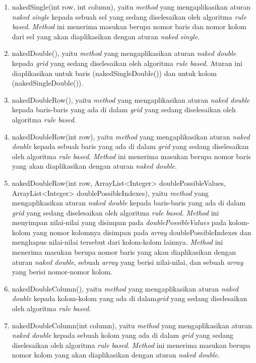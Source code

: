 \begin{enumerate}
\item nakedSingle(int row, int column), yaitu \textit{method} yang mengaplikasikan aturan \textit{naked single} kepada sebuah sel yang sedang diselesaikan oleh algoritma \textit{rule based}. \textit{Method} ini menerima masukan berupa nomor baris dan nomor kolom dari sel yang akan diaplikasikan dengan aturan \textit{naked single}.
\item nakedDouble(), yaitu \textit{method} yang mengaplikasikan aturan \textit{naked double} kepada \textit{grid} yang sedang diselesaikan oleh algoritma \textit{rule based}. Aturan ini diaplikasikan untuk baris (nakedSingleDouble()) dan untuk kolom (nakedSingleDouble()).
\item nakedDoubleRow(), yaitu \textit{method} yang mengaplikasikan aturan \textit{naked double} kepada baris-baris yang ada di dalam \textit{grid} yang sedang diselesaikan oleh algoritma \textit{rule based}.
\item nakedDoubleRow(int row), yaitu \textit{method} yang mengaplikasikan aturan \textit{naked double} kepada sebuah baris yang ada di dalam \textit{grid} yang sedang diselesaikan oleh algoritma \textit{rule based}. \textit{Method} ini menerima masukan berupa nomor baris yang akan diaplikasikan dengan aturan \textit{naked double}.
\item nakedDoubleRow(int row, ArrayList<Integer> doublePossibleValues, ArrayList<Integer> doublePossibleIndexes), yaitu \textit{method} yang mengaplikasikan aturan \textit{naked double} kepada baris-baris yang ada di dalam \textit{grid} yang sedang diselesaikan oleh algoritma \textit{rule based}. \textit{Method} ini menyimpan nilai-nilai yang disimpan pada \textit{doublePossibleValues} pada kolom-kolom yang nomor kolomnya disimpan pada \textit{array} doublePossibleIndexes dan menghapus nilai-nilai tersebut dari kolom-kolom lainnya. \textit{Method} ini menerima masukan berupa nomor baris yang akan diaplikasikan dengan aturan \textit{naked double}, sebuah \textit{array} yang berisi nilai-nilai, dan sebuah \textit{array} yang berisi nomor-nomor kolom.
\item nakedDoubleColumn(), yaitu \textit{method} yang mengaplikasikan aturan \textit{naked double} kepada kolom-kolom yang ada di dalam\textit{grid} yang sedang diselesaikan oleh algoritma \textit{rule based}.
\item nakedDoubleColumn(int column), yaitu \textit{method} yang mengaplikasikan aturan \textit{naked double} kepada sebuah kolom yang ada di dalam \textit{grid} yang sedang diselesaikan oleh algoritma \textit{rule based}. \textit{Method} ini menerima masukan berupa nomor kolom yang akan diaplikasikan dengan aturan \textit{naked double}.

\end{enumerate}
